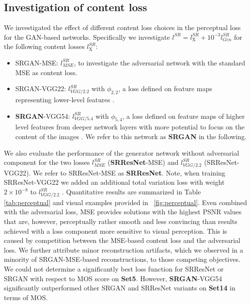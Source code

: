 \documentclass[10pt,twocolumn,letterpaper]{article}
\begin{document}
\subsection{Investigation of content loss}
We investigated the effect of different content loss choices in the perceptual loss for the \ac{GAN}-based networks. Specifically we investigate $l^{SR} = l^{SR}_\textrm{X} + 10^{-3}l^{SR}_{Gen}$ for the following content losses $l^{SR}_\textrm{X}$:\\
\begin{itemize}
	\item SRGAN-MSE: $l^{SR}_{MSE}$, to investigate the adversarial network with the standard \ac{MSE} as content loss.
 	\item SRGAN-VGG22: $l^{SR}_{VGG/2.2}$ with $\phi_{2,2}$, a loss defined on feature maps representing lower-level features \cite{zeiler2014visualizing}.
	\item \textbf{SRGAN}-VGG54: $l^{SR}_{VGG/5.4}$ with $\phi_{5,4}$, a loss defined on feature maps of higher level features from deeper network layers with more potential to focus on the content of the images \cite{zeiler2014visualizing,Yosinski2015,Mahendran2016}. We refer to this network as \textbf{SRGAN} in the following.
\end{itemize}
We also evaluate the performance of the generator network without adversarial component for the two losses $l^{SR}_{MSE}$ (\textbf{SRResNet}-MSE) and $l^{SR}_{VGG/2.2}$ (SRResNet-VGG22). We refer to SRResNet-MSE as \textbf{SRResNet}.
Note, when training SRResNet-VGG22 we added an additional total variation loss with weight $2\times10^{-8}$ to $l^{SR}_{VGG/2.2}$ \cite{Aly2005,Johnson16PercepLoss}. 
 Quantitative results are summarized in Table \ref{tab:perceptual} and visual examples provided in \figurename~\ref{fig:perceptual}.
 Even combined with the adversarial loss, \ac{MSE} provides solutions with the highest \ac{PSNR} values that are, however, perceptually rather smooth and less convincing than results achieved with a loss component more sensitive to visual perception. This is caused by competition between the \ac{MSE}-based content loss and the adversarial loss. We further attribute minor reconstruction artifacts, which we observed in a minority of SRGAN-MSE-based reconstructions, to those competing objectives. We could not determine a significantly best loss function for SRResNet or SRGAN with respect to \ac{MOS} score on \textbf{Set5}. However, \textbf{SRGAN}-VGG54 significantly outperformed other SRGAN and SRResNet variants on \textbf{Set14} in terms of \ac{MOS}.
\end{document}
